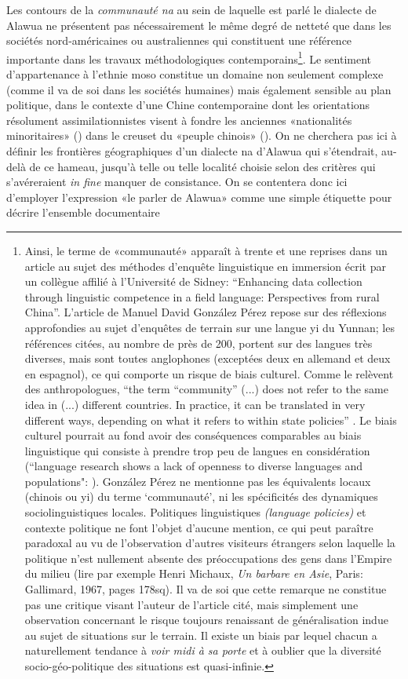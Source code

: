 Les contours de la \emph{communauté na} au sein de laquelle est parlé le dialecte de Alawua ne présentent pas nécessairement le même degré de netteté que dans les sociétés nord-américaines ou australiennes qui constituent une référence importante dans les travaux méthodologiques contemporains\footnote{Ainsi, le terme de «communauté» apparaît à trente et une reprises dans un article au sujet des méthodes d'enquête linguistique en immersion écrit par un collègue affilié à l'Université de Sidney: ``Enhancing data collection through linguistic competence in a field language: Perspectives from rural China''.  L'article de Manuel David González Pérez repose sur des réflexions approfondies au sujet d'enquêtes de terrain sur une langue yi du Yunnan; les références citées, au nombre de près de 200, portent sur des langues très diverses, mais sont toutes anglophones (exceptées deux en allemand et deux en espagnol), ce qui comporte un risque de biais culturel. Comme le relèvent des anthropologues, ``the term “community” (...) does not refer to the same idea in (...) different countries. In practice, it can be translated in very different ways, depending on what it refers to within state policies'' \parencite{dallesmarechal_logics_2023}. Le biais culturel pourrait au fond avoir des conséquences comparables au biais linguistique qui consiste à prendre trop peu de langues en considération (``language research shows a lack of openness to diverse languages and populations": \cite[23]{bochynska_reproducible_2023}). González Pérez ne mentionne pas les équivalents locaux (chinois ou yi) du terme `communauté', ni les spécificités des dynamiques sociolinguistiques locales. Politiques linguistiques \emph{(language policies)} et contexte politique ne font l'objet d'aucune mention, ce qui peut paraître paradoxal au vu de l'observation d'autres visiteurs étrangers selon laquelle la politique n'est nullement absente des préoccupations des gens dans l'Empire du milieu (lire par exemple Henri Michaux, \emph{Un barbare en Asie}, Paris: Gallimard, 1967, pages 178sq). Il va de soi que cette remarque ne constitue pas une critique visant l'auteur de l'article cité, mais simplement une observation concernant le risque toujours renaissant de généralisation indue au sujet de situations sur le terrain. Il existe un biais par lequel chacun a naturellement tendance à \emph{voir midi à sa porte} et à oublier que la diversité socio-géo-politique des situations est quasi-infinie.}. Le sentiment d'appartenance à l'ethnie moso constitue un domaine non seulement complexe (comme il va de soi dans les sociétés humaines) mais également sensible au plan politique, dans le contexte d'une Chine contemporaine dont les orientations résolument assimilationnistes visent à fondre les anciennes «nationalités minoritaires» () dans le creuset du «peuple chinois» (). On ne cherchera pas ici à définir les frontières géographiques d'un dialecte na d'Alawua qui s'étendrait, au-delà de ce hameau, jusqu'à telle ou telle localité choisie selon des critères qui s'avéreraient \emph{in fine} manquer de consistance. On se contentera donc ici d'employer l'expression «le parler de Alawua» comme une simple étiquette pour décrire l'ensemble documentaire 